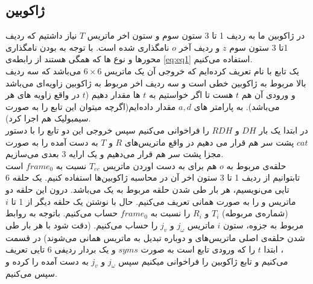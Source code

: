 \documentclass{article}
\begin{document}
\subsection{ژاکوبین }
در ژاکوبین   ما به ردیف 1 تا 3 ستون سوم و ستون اخر ماتریس $T$ نیاز داشتیم که ردیف 1تا 3 ستون سوم $z$ و ردیف آخر $o$ نامگذاری شده است.
با توجه به   بودن نامگذاری محور‌ها و نوع   ها که همگی   هستند از رابطه‌ی \ref{eq:eq1} استفاده می‌کنیم.
\\
یک تابع با نام  تعریف کرده‌ایم که خروجی آن یک ماتریس  $6\times6$ می‌باشد که سه ردیف بالا مربوط به ژاکوبین خطی است و سه ردیف اخر مربوط به ژاکوبین زاویه‌ای می‌باشد و ورودی آن هم $t$  هست تا اگر خواستیم به $t$ ها مقدار دهیم ($t$ در واقع زاویه های هر  می‌باشد).
به پارامتر های $a, d$ مقدار داده‌ایم(اگرچه میتوان این تابع را به صورت سیمبولیک هم اجرا کرد).
\\
در ابتدا یک بار $DH$ و $RDH$ را فراخوانی می‌کنیم سپس خروجی این دو تابع را با دستور $cat$ پشت سر هم قرار می دهیم در واقع ماتریس‌های $R$ و $T$ به دست آمده را به صورت مجزا پشت سر هم قرار می‌دهیم و یک ارایه 3 بعدی می‌سازیم.
\\
حلقه‌ی مربوط به $o$ هم برای به دست اوردن ماتریس $T_{ee}$ نسبت به $frame_{0}$ است تابتوانیم از ردیف 1 تا 3 ستون اخر آن در محاسبه  ژاکوبین‌ها استفاده کنیم.
یک حلقه 6 تایی می‌نویسیم، هر بار طی شدن حلقه مربوط به یک   می‌باشد. درون این حلقه دو ماتریس  و   را به صورت همانی تعریف می‌کنیم. حال با نوشتن یک حلقه دیگر از 1 تا $i$ (شماره‌ی  مربوطه) $T_{i}$ و $R_{i}$ را نسبت به $frame_{0}$ حساب می‌کنیم. باتوجه به روابط مربوط به جزوه، ستون $i$ ماتریس $j_{\omega}$ و $j_{v}$ را حساب می‌کنیم. (دقت شود با هر بار طی شدن حلقه‌ی اصلی ماتریس‌های  و   دوباره تبدیل به ماتریس همانی می‌شوند)
در قسمت   ،  ابتدا $t$ را که ورودی تابع است به صورت $syms$ و یک بردار ردیفی 6 تایی تعریف می‌کنیم و  تابع ژاکوبین را فراخوانی میکنیم سپس $j_{\omega}$ و $j_{v}$ به دست آمده را  کرده و سپس  می‌کنیم.

\end{document}
